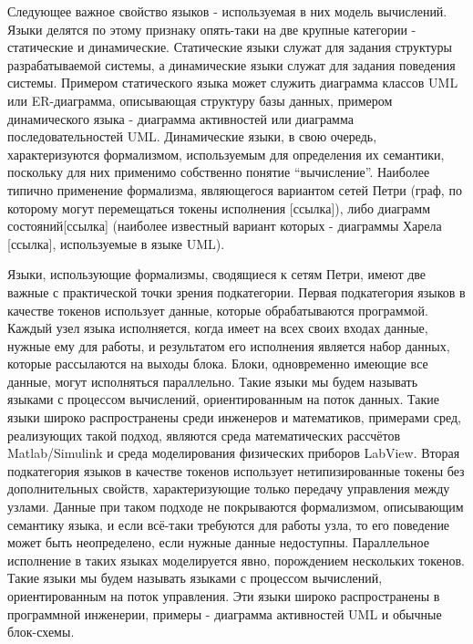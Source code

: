 Следующее важное свойство языков - используемая в них модель вычислений. Языки делятся по этому признаку опять-таки на две крупные категории - статические и динамические. Статические языки служат для задания структуры разрабатываемой системы, а динамические языки служат для задания поведения системы. Примером статического языка может служить диаграмма классов UML или ER-диаграмма, описывающая структуру базы данных, примером динамического языка - диаграмма активностей или диаграмма последовательностей UML. Динамические языки, в свою очередь, характеризуются формализмом, используемым для определения их семантики, поскольку для них применимо собственно понятие “вычисление”. Наиболее типично применение формализма, являющегося вариантом сетей Петри (граф, по которому могут перемещаться токены исполнения [ссылка]), либо диаграмм состояний[ссылка] (наиболее известный вариант которых - диаграммы Харела [ссылка], используемые в языке UML). 

Языки, использующие формализмы, сводящиеся к сетям Петри, имеют две важные с практической точки зрения подкатегории. Первая подкатегория языков в качестве токенов использует данные, которые обрабатываются программой. Каждый узел языка исполняется, когда имеет на всех своих входах данные, нужные ему для работы, и результатом его исполнения является набор данных, которые рассылаются на выходы блока. Блоки, одновременно имеющие все данные, могут исполняться параллельно. Такие языки мы будем называть языками с процессом вычислений, ориентированным на поток данных. Такие языки широко распространены среди инженеров и математиков, примерами сред, реализующих такой подход, являются среда математических рассчётов Matlab/Simulink и среда моделирования физических приборов LabView. Вторая подкатегория языков в качестве токенов использует нетипизированные токены без дополнительных свойств, характеризующие только передачу управления между узлами. Данные при таком подходе не покрываются формализмом, описывающим семантику языка, и если всё-таки требуются для работы узла, то его поведение может быть неопределено, если нужные данные недоступны. Параллельное исполнение в таких языках моделируется явно, порождением нескольких токенов. Такие языки мы будем называть языками с процессом вычислений, ориентированным на поток управления. Эти языки широко распространены в программной инженерии, примеры - диаграмма активностей UML и обычные блок-схемы.

